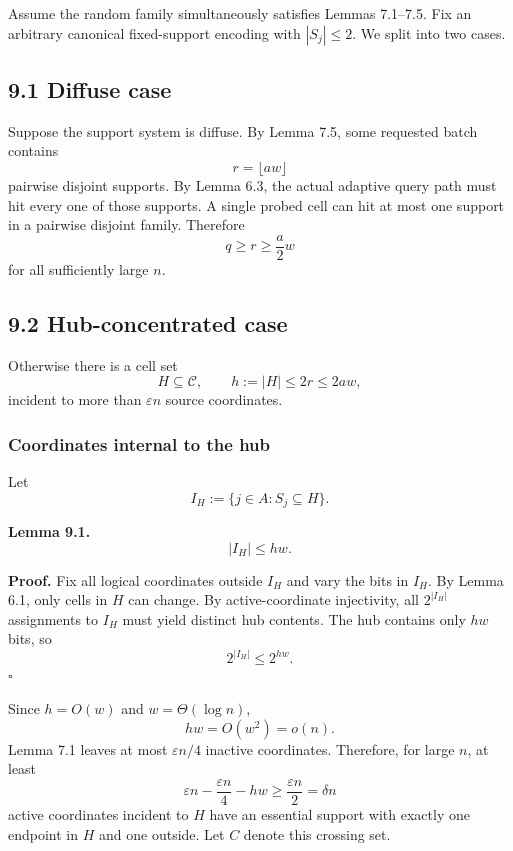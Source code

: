 \documentclass[
]{article}
\begin{document}
Assume the random family simultaneously satisfies Lemmas 7.1--7.5. Fix
an arbitrary canonical fixed-support encoding with \(|S_j|\le2\). We
split into two cases.

\hypertarget{diffuse-case}{%
\subsection{9.1 Diffuse case}\label{diffuse-case}}

Suppose the support system is diffuse. By Lemma 7.5, some requested
batch contains \[
r=\lfloor aw\rfloor
\] pairwise disjoint supports. By Lemma 6.3, the actual adaptive query
path must hit every one of those supports. A single probed cell can hit
at most one support in a pairwise disjoint family. Therefore \[
q\ge r\ge\frac a2w
\] for all sufficiently large \(n\).

\hypertarget{hub-concentrated-case}{%
\subsection{9.2 Hub-concentrated case}\label{hub-concentrated-case}}

Otherwise there is a cell set \[
H\subseteq\mathcal C,
\qquad
h:=|H|\le2r\le2aw,
\] incident to more than \(\varepsilon n\) source coordinates.

\hypertarget{coordinates-internal-to-the-hub}{%
\subsubsection{Coordinates internal to the
hub}\label{coordinates-internal-to-the-hub}}

Let \[
I_H:=\{j\in A:S_j\subseteq H\}.
\]

\textbf{Lemma 9.1.} \[
|I_H|\le hw.
\]

\textbf{Proof.} Fix all logical coordinates outside \(I_H\) and vary the
bits in \(I_H\). By Lemma 6.1, only cells in \(H\) can change. By
active-coordinate injectivity, all \(2^{|I_H|}\) assignments to \(I_H\)
must yield distinct hub contents. The hub contains only \(hw\) bits, so
\[
2^{|I_H|}\le2^{hw}.
\] \(\square\)

Since \(h=O(w)\) and \(w=\Theta(\log n)\), \[
hw=O(w^2)=o(n).
\] Lemma 7.1 leaves at most \(\varepsilon n/4\) inactive coordinates.
Therefore, for large \(n\), at least \[
\varepsilon n-\frac{\varepsilon n}{4}-hw
\ge
\frac{\varepsilon n}{2}
=
\delta n
\] active coordinates incident to \(H\) have an essential support with
exactly one endpoint in \(H\) and one outside. Let \(C\) denote this
crossing set.
\end{document}
